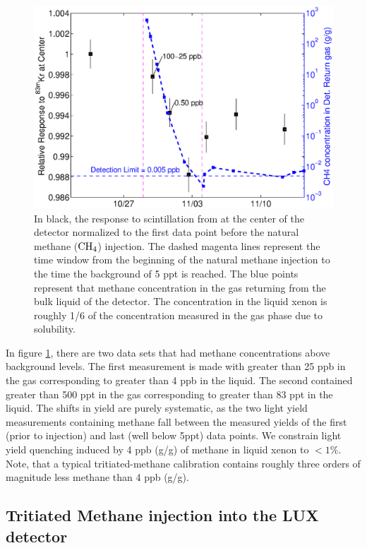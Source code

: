 \renewcommand{\baselinestretch}{1}
\small\normalsize
\begin{figure}[h!]\centering
\includegraphics[width=120mm]{Chapter_T/Figures/CH4/CH4_Kr.eps}
\caption{In black, the response to scintillation from \KrCal at the center of the detector normalized to the first data point before the natural methane ($\rm CH_4$) injection. The dashed magenta lines represent the time window from the beginning of the natural methane injection to the time the background of 5 ppt is reached. The blue points represent that methane concentration in the gas returning from the bulk liquid of the detector. The concentration in the liquid xenon is roughly 1/6 of the concentration measured in the gas phase due to solubility.  }
\label{fig:Methane_LY}
\end{figure}
\renewcommand{\baselinestretch}{2}
\small\normalsize

In figure \ref{fig:Methane_LY}, there are two \KrCal data sets that had methane concentrations above background levels. The first measurement is made with greater than 25 ppb in the gas corresponding to greater than 4 ppb in the liquid. The second contained greater than 500 ppt in the gas corresponding to greater than 83 ppt in the liquid. The shifts in yield are purely systematic, as the two light yield measurements containing methane fall between the measured yields of the first (prior to injection) and last (well below 5ppt) data points. We constrain light yield quenching induced by 4 ppb (g/g) of methane in liquid xenon to $<1\%$. Note, that a typical tritiated-methane calibration contains roughly three orders of magnitude less methane than 4 ppb (g/g).


\subsection{Tritiated Methane injection into the LUX detector}

